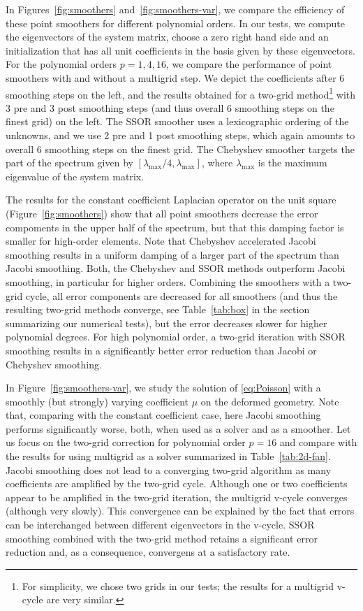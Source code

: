 \documentclass[smallcondensed,final]{svjour3}     %
\begin{document}
In Figures~\ref{fig:smoothers} and~\ref{fig:smoothers-var}, we compare the
efficiency of these point smoothers for different polynomial orders. In our
tests, we compute the eigenvectors of the system matrix, choose a zero right
hand side and an initialization that has all unit coefficients in the basis
given by these eigenvectors. For the polynomial orders $p=1,4,16$, we compare
the performance of point smoothers with and without a multigrid step.  We
depict the coefficients after 6 smoothing steps on the left, and the results
obtained for a two-grid method\footnote{For simplicity, we chose two grids in
our tests; the results for a multigrid v-cycle are very similar.} with 3 pre
and 3 post smoothing steps (and thus overall 6 smoothing steps on the finest
grid) on the left. The SSOR smoother uses a lexicographic ordering of the
unknowns, and we use 2 pre and 1 post smoothing steps, which again amounts to
overall 6 smoothing steps on the finest grid. The Chebyshev smoother targets
the part of the spectrum given by $[\lambda_\text{max}/4,\lambda_\text{max}]$,
where $\lambda_\text{max}$ is the maximum eigenvalue of the system matrix. 

The results for the constant coefficient Laplacian operator on the
unit square (Figure~\ref{fig:smoothers}) show that all point
smoothers decrease the error compoments in the upper half of the
spectrum, but that this damping factor is smaller for high-order
elements. Note that Chebyshev accelerated Jacobi smoothing results in
a uniform damping of a larger part of the spectrum than Jacobi
smoothing.  Both, the Chebyshev and SSOR methods outperform Jacobi
smoothing, in particular for higher orders. Combining the smoothers
with a two-grid cycle, all error components are decreased for all
smoothers (and thus the resulting two-grid methods converge, see
Table~\ref{tab:box} in the section summarizing our numerical tests),
but the error decreases slower for higher polynomial degrees. For high
polynomial order, a two-grid iteration with SSOR smoothing results in a
significantly better error reduction than Jacobi or Chebyshev
smoothing.

In Figure~\ref{fig:smoothers-var}, we study the solution of
\eqref{eq:Poisson} with a smoothly (but strongly) varying coefficient
$\mu$ on the deformed geometry. Note that, comparing with the constant
coefficient case, here Jacobi smoothing performs significantly worse,
both, when used as a solver and as a smoother. Let us focus on the
two-grid correction for polynomial order $p=16$ and compare with the
results for using multigrid as a solver summarized in
Table~\ref{tab:2d-fan}.  Jacobi smoothing does not lead to a
converging two-grid algorithm as many coefficients are amplified by
the two-grid cycle. Although one or two coefficients appear to be
amplified in the two-grid iteration, the multigrid v-cycle converges
(although very slowly). This convergence can be explained by the fact
that errors can be interchanged between different eigenvectors in the
v-cycle.  SSOR smoothing combined with the two-grid method retains a
significant error reduction and, as a consequence, convergens at a
satisfactory rate.
\end{document}
